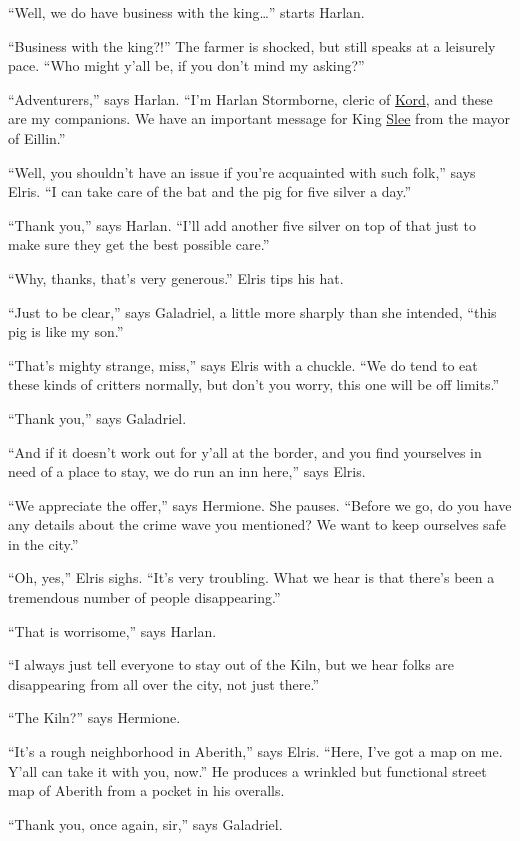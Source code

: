 \documentclass[smalldemyvopaper,11pt,twoside,onecolumn,openright,extrafontsizes]{memoir}
\begin{document}
``Well, we do have business with the king\ldots{}'' starts Harlan.

``Business with the king?!'' The farmer is shocked, but still speaks at
a leisurely pace. ``Who might y'all be, if you don't mind my asking?''

``Adventurers,'' says Harlan. ``I'm Harlan Stormborne, cleric of
\href{/characters/kord/}{Kord}, and these are my companions. We have an
important message for King \href{/characters/slee/}{Slee} from the mayor
of Eillin.''

``Well, you shouldn't have an issue if you're acquainted with such
folk,'' says Elris. ``I can take care of the bat and the pig for five
silver a day.''

``Thank you,'' says Harlan. ``I'll add another five silver on top of
that just to make sure they get the best possible care.''

``Why, thanks, that's very generous.'' Elris tips his hat.

``Just to be clear,'' says Galadriel, a little more sharply than she
intended, ``this pig is like my son.''

``That's mighty strange, miss,'' says Elris with a chuckle. ``We do tend
to eat these kinds of critters normally, but don't you worry, this one
will be off limits.''

``Thank you,'' says Galadriel.

``And if it doesn't work out for y'all at the border, and you find
yourselves in need of a place to stay, we do run an inn here,'' says
Elris.

``We appreciate the offer,'' says Hermione. She pauses. ``Before we go,
do you have any details about the crime wave you mentioned? We want to
keep ourselves safe in the city.''

``Oh, yes,'' Elris sighs. ``It's very troubling. What we hear is that
there's been a tremendous number of people disappearing.''

``That is worrisome,'' says Harlan.

``I always just tell everyone to stay out of the Kiln, but we hear folks
are disappearing from all over the city, not just there.''

``The Kiln?'' says Hermione.

``It's a rough neighborhood in Aberith,'' says Elris. ``Here, I've got a
map on me. Y'all can take it with you, now.'' He produces a wrinkled but
functional street map of Aberith from a pocket in his overalls.

``Thank you, once again, sir,'' says Galadriel.
\end{document}
